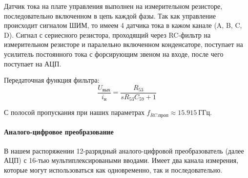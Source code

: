 Датчик тока на плате управления выполнен на измерительном резисторе, последовательно
включенном в цепь каждой фазы. Так как управление происходит сигналом ШИМ, то имеем 4
датчика тока в кажом канале (A, B, C, D).
Сигнал с сериесного резистора, проходящий через RC-фильтр на измерительном резисторе и паралельно включенном
конденсаторе, поступает на усилитель постоянного тока с форсирующим звеном на входе, после чего поступает на АЦП.

Передаточная функция фильтра:
$$
    \frac{ U_\text{вых} }{ i_\text{н} } = \frac{ R_{53} }{ s R_{53} C_{59} + 1 }
$$

С полосой пропускания при наших параметрах $f_{RC.\text{проп} } \approx 15.915 ~\text{ГГц}$.

\newpage
\paragraph{Аналого-цифровое преобразование}
В нашем распоряжении 12-разрядный аналого-цифровой преобразователь (далее АЦП) с 16-тью
мультиплексироваными вводами.
Имеет два канала измерения, которые могут использоваться как одновременно, так и последовательно.

